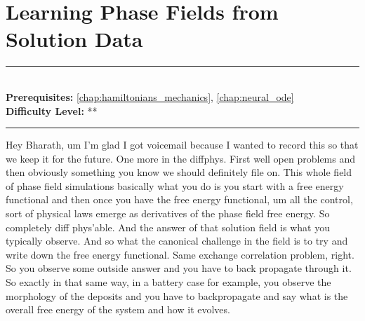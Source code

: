 \documentclass[book.tex]{subfiles}
\begin{document}
\chapter{Learning Phase Fields from Solution Data}
\label{chap:hamiltonian_nn}
\noindent\rule{11cm}{0.4pt} \\
\textbf{Prerequisites:} \autoref{chap:hamiltonians_mechanics}, \autoref{chap:neural_ode} \\
\textbf{Difficulty Level:} ** \\
\noindent\rule{11cm}{0.4pt}
\vspace{5mm}



Hey Bharath, um I'm glad I got voicemail because I wanted to record this so that we keep it for the future. One more in the diffphys. First well open problems and then obviously something you know we should definitely file on. This whole field of phase field simulations basically what you do is you start with a free energy functional and then once you have the free energy functional, um all the control, sort of physical laws emerge as derivatives of the phase field free energy. So completely diff phys'able. And the answer of that solution field is what you typically observe. And so what the canonical challenge in the field is to try and write down the free energy functional. Same exchange correlation problem, right. So you  observe some outside answer and you have to back propagate through it. So exactly in that same way, in a battery case for example, you observe the morphology of the deposits and you have to backpropagate and say what is the overall free energy of the system and how it evolves.
\end{document}
